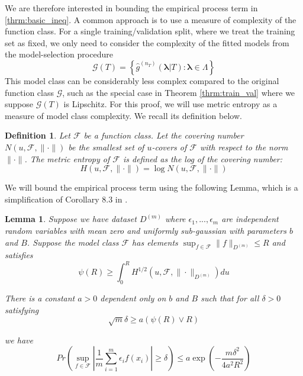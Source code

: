 \documentclass[12pt]{article}
\newtheorem{lemma}{Lemma}
\newtheorem{definition}{Definition}
\begin{document}
We are therefore interested in bounding the empirical process term in \eqref{thrm:basic_ineq}. A common approach is to use a measure of complexity of the function class. For a single training/validation split, where we treat the training set as fixed, we only need to consider the complexity of the fitted models from the model-selection procedure
\begin{equation}
\mathcal{G}(T)=\left\{ \hat{g}^{(n_T)}(\boldsymbol{\lambda}|T) : \boldsymbol{\lambda} \in \Lambda \right\}
\end{equation}
This model class can be considerably less complex compared to the original function class $\mathcal{G}$, such as the special case in Theorem \ref{thrm:train_val} where we suppose $\mathcal{G}(T)$ is Lipschitz. For this proof, we will use metric entropy as a measure of model class complexity. We recall its definition below.
\begin{definition}
	Let $\mathcal{F}$ be a function class. Let the covering number $N(u, \mathcal{F}, \| \cdot \|)$ be the smallest set of $u$-covers of $\mathcal{F}$ with respect to the norm $\| \cdot \|$. The metric entropy of $\mathcal{F}$ is defined as the log of the covering number:
	\begin{equation}
	H (u, \mathcal{F}, \| \cdot \| ) = \log N(u, \mathcal{F}, \| \cdot \|)
	\end{equation}
\end{definition}

We will bound the empirical process term using the following Lemma, which is a simplification of Corollary 8.3 in \citet{van2000empirical}.

\begin{lemma}
	\label{lemma:cor83}
	Suppose we have dataset $D^{(m)}$ where $\epsilon_1,...,\epsilon_m$ are independent random variables with mean zero and uniformly sub-gaussian with parameters $b$ and $B$. Suppose
	the model class $\mathcal{F}$ has elements $\sup_{f\in\mathcal{F}}\|f\|_{D^{(m)}}\le R$
	and satisfies
	\[
	\psi(R)\ge\int_{0}^{R}H^{1/2}(u,\mathcal{F},\|\cdot\|_{D^{(m)}})du
	\]
	
	
	There is a constant $a > 0$ dependent only on $b$ and $B$ such that
	for all $\delta>0$ satisfying
	\[
	\sqrt{m}\delta\ge a(\psi(R)\vee R)
	\]
	
	
	we have 
	\[
	Pr\left(\sup_{f\in\mathcal{F}}\left|\frac{1}{m}\sum_{i=1}^{m}\epsilon_{i}f(x_{i})\right|\ge\delta\right)
	\le 
	a\exp\left(-\frac{m\delta^{2}}{4a^{2}R^{2}}\right)
	\]
	
\end{lemma}
\end{document}
